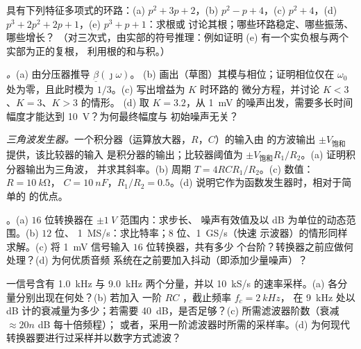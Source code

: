 \begin{exercise}[$\star\star$]\label{exo:b2:feedback-oscillators:5}
具有下列特征多项式的环路：(a) $p^2 + 3p + 2$，(b) $p^2 - p +
4$，(c) $p^2 + 4$，(d) $p^3 + 2p^2 + 2p + 1$，(e) $p^3 + p + 1$：求根或
讨论其根；哪些环路稳定、哪些振荡、哪些增长？
（对三次式，由实部的符号推理：例如证明 (e)
有一个实负根与两个实部为正的复根，
利用根的和与积。）
\end{exercise}

\begin{exercise}[$\star\star$]\label{exo:b2:feedback-oscillators:6}
\emph{。}(a) 由分压器推导 $\underline\beta(\jmath\omega)$。
(b) 画出（草图）其模与相位；证明相位仅在
$\omega_0$ 处为零，且此时模为 $1/3$。(c) 写出增益为 $K$ 时环路的
微分方程，并讨论 $K < 3$、$K = 3$、$K > 3$ 的情形。
(d) 取 $K = 3.2$，从 \qty{1}{mV} 的噪声出发，需要多长时间
幅度才能达到 \qty{10}{V}？为何最终幅度与
初始噪声无关？
\end{exercise}

\begin{exercise}[$\star\star$]\label{exo:b2:feedback-oscillators:7}
\emph{三角波发生器。}一个积分器（运算放大器，$R$，$C$）的输入由
的方波输出 $\pm V_{\text{饱和}}$ 提供，该比较器的输入
是积分器的输出；比较器阈值为
$\pm V_{\text{饱和}}R_1/R_2$。(a) 证明积分器输出为三角波，
并求其斜率。(b) 周期 $T = 4RCR_1/R_2$。(c) 数值：$R = \qty{10}{k\ohm}$，
$C = \qty{10}{nF}$，$R_1/R_2 = 0.5$。(d) 说明它作为函数发生器时，相对于简单的
的优点。
\end{exercise}

\begin{exercise}[$\star\star$]\label{exo:b2:feedback-oscillators:8}
。(a) $16$ 位转换器在 $\pm\qty{1}{V}$ 范围内：求步长、
噪声有效值及以 dB 为单位的动态范围。(b) $12$ 位、
\qty{1}{MS/s}：求比特率；$8$ 位、\qty{1}{GS/s}（快速
示波器）的情形同样求解。(c) 将 \qty{1}{mV} 信号输入 $16$ 位转换器，共有多少
个台阶？转换器之前应做何处理？(d) 为何优质音频
系统在之前要加入抖动（即添加少量噪声）？
\end{exercise}

\begin{exercise}[$\star\star$]\label{exo:b2:feedback-oscillators:9}
一信号含有 \qty{1.0}{kHz} 与 \qty{9.0}{kHz} 两个分量，并以
\qty{10}{kS/s} 的速率采样。(a) 各分量分别出现在何处？(b) 若加入
一阶 $RC$ ，截止频率 $f_c = \qty{2}{kHz}$，
在 \qty{9}{kHz} 处以 dB 计的衰减量为多少；若需要 \qty{40}{dB}，是否足够？(c)
所需滤波器阶数（衰减 $\approx 20n$ dB 每十倍频程）；
或者，采用一阶滤波器时所需的采样率。(d)
为何现代转换器要进行过采样并以数字方式滤波？
\end{exercise}

